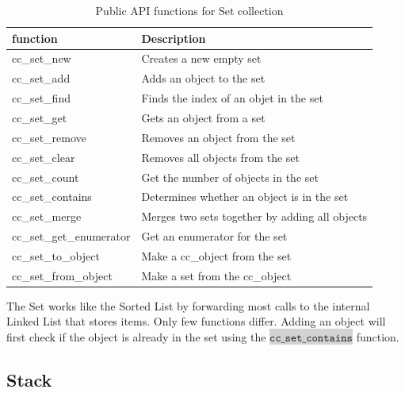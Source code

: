 \documentclass[table]{ituthesis}
\newcommand{\highlight}[1]{\colorbox{lightGray}{$\displaystyle \texttt{#1}$}}
\begin{document}
	\begin{table}[ht]
		\begin{center}
	    \begin{tabular}{| l | l |}
			\hline
			\rowcolor{gray!50}
			\textbf{function}				&		\textbf{Description}															\\ \hline
		    cc\_set\_new            	& Creates a new empty set                         \\ \hline
		    cc\_set\_add            	& Adds an object to the set                       \\ \hline
		    cc\_set\_find           	& Finds the index of an objet in the set          \\ \hline
		    cc\_set\_get            	& Gets an object from a set                       \\ \hline
		    cc\_set\_remove         	& Removes an object from the set                  \\ \hline
		    cc\_set\_clear          	& Removes all objects from the set                \\ \hline
		    cc\_set\_count          	& Get the number of objects in the set            \\ \hline
		    cc\_set\_contains       	& Determines whether an object is in the set      \\ \hline
		    cc\_set\_merge          	& Merges two sets together by adding all objects  \\ \hline
		    cc\_set\_get\_enumerator	& Get an enumerator for the set                   \\ \hline
		    cc\_set\_to\_object     	& Make a cc\_object from the set                  \\ \hline
		    cc\_set\_from\_object   	& Make a set from the cc\_object                  \\ \hline
	    \end{tabular}
			\caption{Public API functions for Set collection}
		\end{center}
	\end{table}
	
	The Set works like the Sorted List by forwarding most calls to the internal Linked List that stores items. Only few functions differ. Adding an object will first check if the object is already in the set using the \highlight{cc\_set\_contains} function. 
	
	\subsection{Stack}
	
\end{document}

